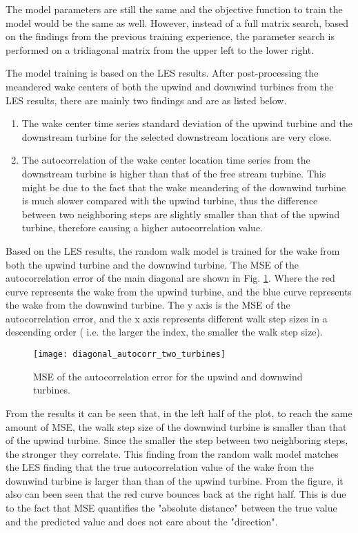 \documentclass{umthesis}
\begin{document}
The model parameters are still the same and the objective function to train the model would be the same as well. However, instead of a full matrix search, based on the findings from the previous training experience, the parameter search is performed on a tridiagonal matrix from the upper left to the lower right.  
 
The model training is based on the LES results. After post-processing the meandered wake centers of both the upwind and downwind turbines from the LES results, there are mainly two findings and are as listed below.

\begin{enumerate}
  \item The wake center time series standard deviation of the upwind turbine and the downstream turbine for the selected downstream locations are very close.
  \item The autocorrelation of the wake center location time series from the downstream turbine is higher than that of the free stream turbine. This might be due to the fact that the wake meandering of the downwind turbine is much slower compared with the upwind turbine, thus the difference between two neighboring steps are slightly smaller than that of the upwind turbine, therefore causing a higher autocorrelation value.
\end{enumerate}

Based on the LES results, the random walk model is trained for the wake from both the upwind turbine and the downwind turbine. The MSE of the autocorrelation error of the main diagonal are shown in Fig. \ref{fig:diag_corr}. Where the red curve represents the wake from the upwind turbine, and the blue curve represents the wake from the downwind turbine. The y axis is the MSE of the autocorrelation error, and the x axis represents different walk step sizes in a descending order ( i.e. the larger the index, the smaller the walk step size).

\begin{figure}
  \centering
  \texttt{[image: diagonal\_autocorr\_two\_turbines]}
  \caption{MSE of the autocorrelation error for the upwind and downwind turbines.}\label{fig:diag_corr}
\end{figure}

From the results it can be seen that, in the left half of the plot, to reach the same amount of MSE, the walk step size of the downwind turbine is smaller than that of the upwind turbine. Since the smaller the step between two neighboring steps, the stronger they correlate. This finding from the random walk model matches the LES finding that the true autocorrelation value of the wake from the downwind turbine is larger than than of the upwind turbine. From the figure, it also can been seen that the red curve bounces back at the right half. This is due to the fact that MSE quantifies the "absolute distance" between the true value and the predicted value and does not care about the "direction".  
\end{document}
